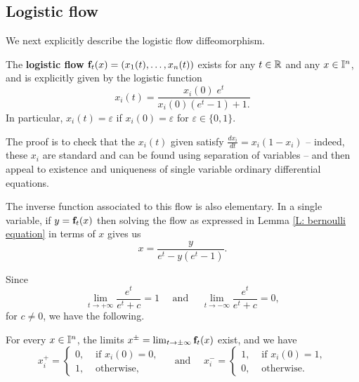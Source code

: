 \subsection{Logistic flow}

We next explicitly describe the logistic flow diffeomorphism.

\begin{lemma} \label{L: bernoulli equation}
	The {\bf logistic flow} $\mathbf{f}_t(x) = (x_1(t), \dots, x_n(t))$ exists for any $t \in \mathbb{R}$ and any $x \in \mathbb{I}^n$,
	and is explicitly given by the logistic function
	\begin{equation*}
	x_i(t) = \frac{x_i(0) \; e^t}{x_i(0)(e^t-1)+1.}
	\end{equation*}
	In particular, $x_i(t) = \varepsilon$ if $x_i(0) = \varepsilon$ for $\varepsilon \in \{0, 1\}$.
\end{lemma}

The proof is to check that the $x_i(t)$ given satisfy $\frac{d x_i}{dt} = x_i(1- x_i)$ -- indeed, these $x_i$ are standard and can be found using separation of variables -- and then appeal to existence and uniqueness of single variable ordinary differential equations.

The inverse function associated to this flow is also elementary. In a single variable, if $y = \mathbf{f}_t(x)$ then solving the flow as expressed in Lemma \ref{L: bernoulli equation} in terms of $x$ gives us 
\begin{equation} \label{E: inverse flow}
x = \frac{y}{e^t - y(e^t-1)}.
\end{equation}

Since 
\begin{equation*}
\lim_{t \to + \infty} \frac{e^t}{e^t + c} = 1
\quad \text{ and } \quad
\lim_{t \to - \infty} \frac{e^t}{e^t + c} = 0,
\end{equation*}
for $c\neq 0$, we have the following. 

\begin{corollary} \label{C: limit of points along the flow}
	For every $x \in \mathbb{I}^n$, the limits $x^\pm = \lim_{t \to \pm \infty} \mathbf{f}_t(x)$ 	exist, and we have
	\begin{equation*}
	x^+_i = \begin{cases}
	0, & \text{ if } x_i(0) = 0, \\ 1, & \text{ otherwise,}
	\end{cases}
	\quad \text{ and } \quad
	x^-_i = \begin{cases}
	1, & \text{ if } x_i(0) = 1, \\ 0, & \text{ otherwise.}
	\end{cases}
	\end{equation*}
\end{corollary}

